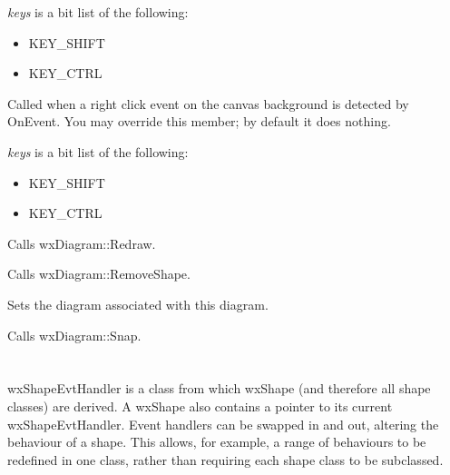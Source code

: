 {\it keys} is a bit list of the following:

\begin{itemize}\itemsep=0pt
\item KEY\_SHIFT
\item KEY\_CTRL
\end{itemize}

\label{wxshapecanvasonrightclick}


Called when a right click event on the canvas background is detected by OnEvent. You may override this member;
by default it does nothing.

{\it keys} is a bit list of the following:

\begin{itemize}\itemsep=0pt
\item KEY\_SHIFT
\item KEY\_CTRL
\end{itemize}



Calls wxDiagram::Redraw.



Calls wxDiagram::RemoveShape.



Sets the diagram associated with this diagram.



Calls wxDiagram::Snap.



\section{}\label{wxshapeevthandler}

wxShapeEvtHandler is a class from which wxShape (and therefore all shape classes) are derived.
A wxShape also contains a pointer to its current wxShapeEvtHandler. Event handlers
can be swapped in and out, altering the behaviour of a shape. This allows, for example,
a range of behaviours to be redefined in one class, rather than requiring
each shape class to be subclassed.

